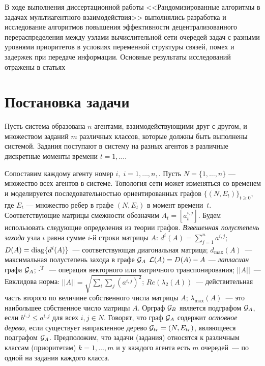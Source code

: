 \documentclass{spisok-article}
\begin{document}
В ходе выполнения диссертационной работы <<Рандомизированные алгоритмы в задачах мультиагентного взаимодействия>> выполнялись разработка и исследование алгоритмов повышения эффективности децентрализованного перераспределения между узлами вычислительной сети очередей задач с разными уровнями приоритетов в условиях переменной структуры связей, помех и задержек при передаче информации. 
Основные результаты исследований отражены в статьях~\cite{vest15,kio15,msc14,ecc15,micnon15,codit16,soi9-1,soi9-2,vspu14,ts14,soi10,soi11}

\section{Постановка задачи}
Пусть система образована $n$ агентами, взаимодействующими друг с другом, и множеством заданий $m$ различных классов, которые должны быть выполнены системой. Задания поступают в систему на разных агентов в различные дискретные моменты времени $t = 1, \ldots$. %

Сопоставим каждому агенту номер $i,\; i= 1, \ldots, n,$. Пусть $N = \{ 1, \ldots, n\}$ --- множество всех агентов в системе. Топология сети может изменяться со временем и моделируется последовательностью ориентированных графов $\{(N, E_{t})\} _{t\ge 0} $, где $E_t %
$
---
множество ребер в графе $(N, E_{t})$ в момент времени~$t$. Соответствующие матрицы смежности обозначим $A_t = [a^{i, j}_t]$. %
Будем использовать
следующие
определения
из теории графов. %
\textit{Взвешенная полустепень захода} узла $i$ равна сумме $i$-й строки матрицы $A$: $d^i(A)=\sum_{j=1}^n a^{i, j}$; $D(A) ={\rm diag}\{d^i(A)\}$~--- соответствующая диагональная матрица; $d_{\max}(A)$~--- максимальная полустепень захода в графе ${\cal G}_A$
${\cal L}(A) = D(A) - A$ --- \textit{лапласиан} графа ${\cal G}_A$; $\cdot^{\rm T}$~--- операция векторного или матричного транспонирования; $||A||$~--- Евклидова норма: $||A||= \sqrt{\sum_i \sum_j (a^{i, j})^2}$; $Re(\lambda_2(A))$~--- действительная часть второго по величине собственного числа матрицы  $A$; $\lambda_{\max}(A)$~--- это наибольшее собственное число матрицы $A$.
Орграф ${\cal G}_B$ является подграфом ${\cal G}_A$, если $b^{i, j} \leq a^{i, j}$ для всех $i,j \in N$.
Говорят, что граф ${\cal G}_A$ содержит \textit{остовное дерево}, если существует направленное дерево ${\cal G}_{tr}=(N,E_{tr})$, являющееся подграфом ${\cal G}_A$.
\fi
Предположим, что задачи (задания) относятся к различным классам (приоритетам) $k = 1, \ldots, m$ и у каждого агента есть $m$ очередей~--- по одной на задания каждого класса.
\end{document}
